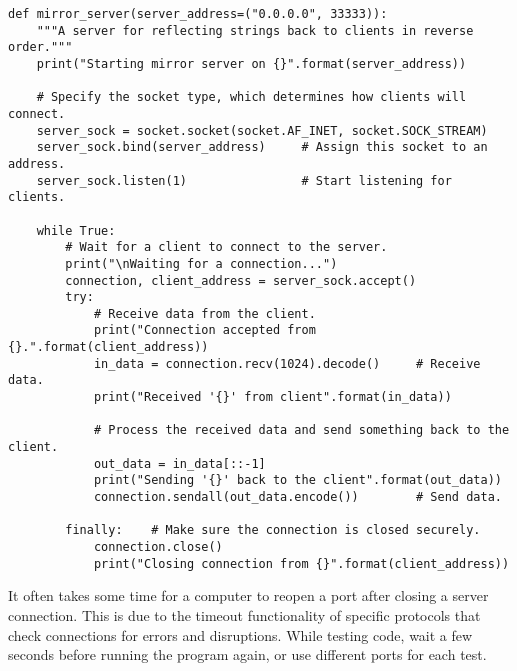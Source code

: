 \begin{lstlisting}
def mirror_server(server_address=("0.0.0.0", 33333)):
    """A server for reflecting strings back to clients in reverse order."""
    print("Starting mirror server on {}".format(server_address))

    # Specify the socket type, which determines how clients will connect.
    server_sock = socket.socket(socket.AF_INET, socket.SOCK_STREAM)
    server_sock.bind(server_address)     # Assign this socket to an address.
    server_sock.listen(1)                # Start listening for clients.

    while True:
        # Wait for a client to connect to the server.
        print("\nWaiting for a connection...")
        connection, client_address = server_sock.accept()
        try:
            # Receive data from the client.
            print("Connection accepted from {}.".format(client_address))
            in_data = connection.recv(1024).decode()     # Receive data.
            print("Received '{}' from client".format(in_data))

            # Process the received data and send something back to the client.
            out_data = in_data[::-1]
            print("Sending '{}' back to the client".format(out_data))
            connection.sendall(out_data.encode())        # Send data.

        finally:    # Make sure the connection is closed securely.
            connection.close()
            print("Closing connection from {}".format(client_address))
\end{lstlisting}

\vspace{3mm}
\begin{warn}
It often takes some time for a computer to reopen a port after closing a server connection.
This is due to the timeout functionality of specific protocols that check connections for errors and disruptions.
While testing code, wait a few seconds before running the program again, or use different ports for each test.
\end{warn}


